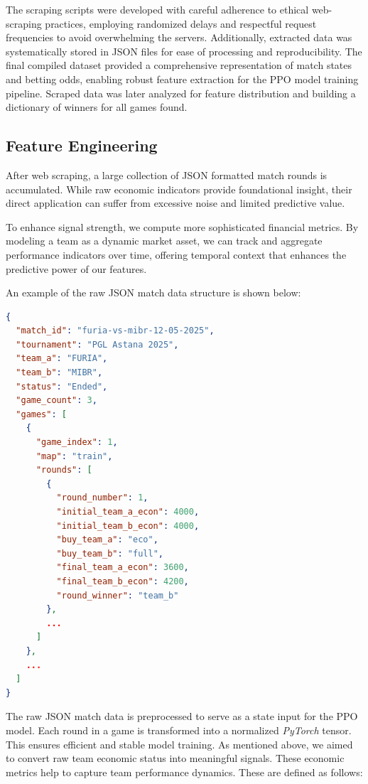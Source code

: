 \documentclass[sigconf]{acmart}
\begin{document}
The scraping scripts were developed with careful adherence to ethical web-scraping practices, employing randomized delays and respectful request frequencies to avoid overwhelming the servers. Additionally, extracted data was systematically stored in JSON files for ease of processing and reproducibility. The final compiled dataset provided a comprehensive representation of match states and betting odds, enabling robust feature extraction for the PPO model training pipeline. Scraped data was later analyzed for feature distribution and building a dictionary of winners for all games found.

\subsection{Feature Engineering}

After web scraping, a large collection of JSON formatted match rounds is accumulated. While raw economic indicators provide foundational insight, their direct application can suffer from excessive noise and limited predictive value.

To enhance signal strength, we compute more sophisticated financial metrics. By modeling a team as a dynamic market asset, we can track and aggregate performance indicators over time, offering temporal context that enhances the predictive power of our features.

An example of the raw JSON match data structure is shown below:

\begin{lstlisting}[language=json,firstnumber=1]
{
  "match_id": "furia-vs-mibr-12-05-2025",
  "tournament": "PGL Astana 2025",
  "team_a": "FURIA",
  "team_b": "MIBR",
  "status": "Ended",
  "game_count": 3,
  "games": [
    {
      "game_index": 1,
      "map": "train",
      "rounds": [
        {
          "round_number": 1,
          "initial_team_a_econ": 4000,
          "initial_team_b_econ": 4000,
          "buy_team_a": "eco",
          "buy_team_b": "full",
          "final_team_a_econ": 3600,
          "final_team_b_econ": 4200,
          "round_winner": "team_b"
        },
        ...
      ]
    },
    ...
  ]
}
\end{lstlisting}

The raw JSON match data is preprocessed to serve as a state input for the PPO model. Each round in a game is transformed into a normalized \textit{PyTorch} tensor. This ensures efficient and stable model training. As mentioned above, we aimed to convert raw team economic status into meaningful signals. These economic metrics help to capture team performance dynamics. These are defined as follows:
\end{document}
